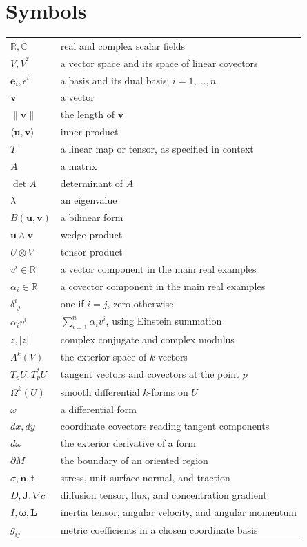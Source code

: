 \documentclass[10pt,oneside]{book}
\begin{document}
\chapter{Symbols}
\begin{longtable}{lp{}}
$\mathbb R,\mathbb C$ & real and complex scalar fields\\
$V,V^*$ & a vector space and its space of linear covectors\\
$\mathbf e_i,\epsilon^i$ & a basis and its dual basis; $i=1,\ldots,n$\\
$\mathbf{v}$ & a vector\\
$\|\mathbf{v}\|$ & the length of $\mathbf{v}$\\
$\langle \mathbf{u},\mathbf{v}\rangle$ & inner product\\
$T$ & a linear map or tensor, as specified in context\\
$A$ & a matrix\\
$\det A$ & determinant of $A$\\
$\lambda$ & an eigenvalue\\
$B(\mathbf{u},\mathbf{v})$ & a bilinear form\\
$\mathbf{u}\wedge\mathbf{v}$ & wedge product\\
$U\otimes V$ & tensor product\\
$v^i\in\mathbb R$ & a vector component in the main real examples\\
$\alpha_i\in\mathbb R$ & a covector component in the main real examples\\
$\delta^i{}_j$ & one if $i=j$, zero otherwise\\
$\alpha_i v^i$ & $\sum_{i=1}^n\alpha_i v^i$, using Einstein summation\\
$\overline z,\lvert z\rvert$ & complex conjugate and complex modulus\\
$\Lambda^k(V)$ & the exterior space of $k$-vectors\\
$T_pU,T_p^*U$ & tangent vectors and covectors at the point $p$\\
$\Omega^k(U)$ & smooth differential $k$-forms on $U$\\
$\omega$ & a differential form\\
$dx,dy$ & coordinate covectors reading tangent components\\
$d\omega$ & the exterior derivative of a form\\
$\partial M$ & the boundary of an oriented region\\
$\sigma,\mathbf n,\mathbf t$ & stress, unit surface normal, and traction\\
$D,\mathbf J,\nabla c$ & diffusion tensor, flux, and concentration gradient\\
$I,\boldsymbol\omega,\mathbf L$ & inertia tensor, angular velocity, and angular momentum\\
$g_{ij}$ & metric coefficients in a chosen coordinate basis\\
\end{longtable}
\end{document}
